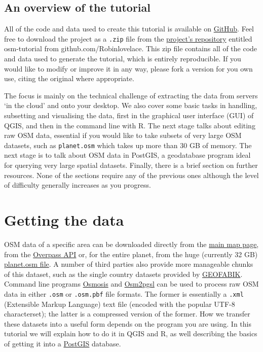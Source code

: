 \documentclass[]{article}
\begin{document}
\subsection{An overview of the tutorial}

All of the code and data used to create this tutorial is available on
\href{http://github.com}{GitHub}. Feel free to download the project as a
\texttt{.zip} file from the
\href{https://github.com/Robinlovelace/osm-tutorial}{project's
repository} entitled osm-tutorial from github.com/Robinlovelace. This
zip file contains all of the code and data used to generate the
tutorial, which is entirely reproducible. If you would like to modify or
improve it in any way, please fork a version for you own use, citing the
original where appropriate.

The focus is mainly on the technical challenge of extracting the data
from servers `in the cloud' and onto your desktop. We also cover some
basic tasks in handling, subsetting and visualising the data, first in
the graphical user interface (GUI) of QGIS, and then in the command line
with R. The next stage talks about editing raw OSM data, essential if
you would like to take subsets of very large OSM datasets, such as
\texttt{planet.osm} which takes up more than 30 GB of memory. The next
stage is to talk about OSM data in PostGIS, a geodatabase program ideal
for querying very large spatial datasets. Finally, there is a brief
section on further resources. None of the sections require any of the
previous ones although the level of difficulty generally increases as
you progress.

\section{Getting the data}

OSM data of a specific area can be downloaded directly from the
\href{http://www.openstreetmap.org}{main map page}, from the
\href{http://overpass-api.de/}{Overpass API} or, for the entire planet,
from the huge (currently 32 GB)
\href{http://planet.openstreetmap.org/}{planet.osm file}. A number of
third parties also provide more manageable chunks of this dataset, such
as the single country datasets provided by
\href{http://download.geofabrik.de/}{GEOFABIK}. Command line programs
\href{http://wiki.openstreetmap.org/wiki/Osmosis}{Osmosis} and
\href{http://wiki.openstreetmap.org/wiki/Osm2pgsql}{Osm2pgsl} can be
used to process raw OSM data in either \texttt{.osm} or
\texttt{.osm.pbf} file formats. The former is essentially a
\texttt{.xml} (Extensible Markup Language) text file (encoded with the
popular UTF-8 characterset); the latter is a compressed version of the
former. How we transfer these datasets into a useful form depends on the
program you are using. In this tutorial we will explain how to do it in
QGIS and R, as well describing the basics of getting it into a
\href{http://postgis.net/}{PostGIS} database.
\end{document}
